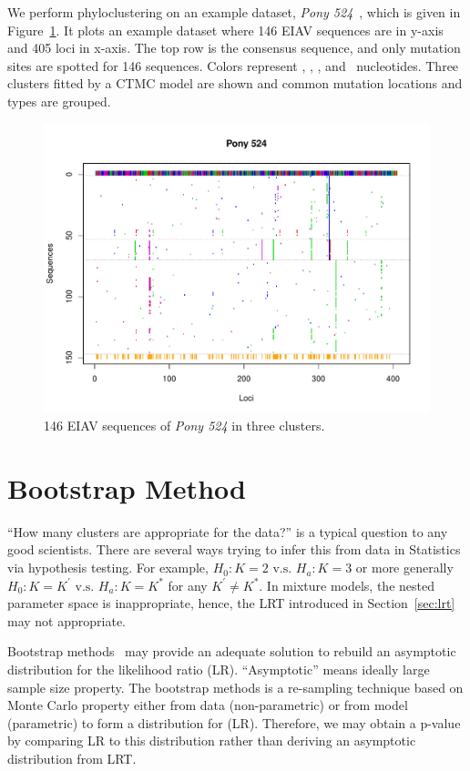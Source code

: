 We perform phyloclustering on an example dataset,
{\it Pony 524}~\citep{Carpenter2011},
which is given in Figure~\ref{fig:eiav}.
It plots an example dataset where 146 EIAV sequences
are in y-axis and 405 loci in x-axis.
The top row is the consensus sequence, and only mutation sites are spotted
for 146 sequences. Colors represent , , , and
 \ nucleotides. Three clusters fitted by a CTMC model are shown and
common mutation locations and types are grouped.
\begin{figure}[h!tb]
\centering
 \includegraphics[width=6in]{pbdDEMO-include/pics/pony524}
\caption{146 EIAV sequences of {\it Pony 524}
in three clusters.}
\label{fig:eiav}
\end{figure}




\section{Bootstrap Method}
\label{sec:bootstrap}

``How many clusters are appropriate for the data?'' is a typical question
to any good scientists. There are several ways trying to infer this from
data in Statistics via hypothesis testing. For example,
$H_0: K = 2 \mbox{ v.s. } H_a: K = 3$ or more generally
$H_0: K = K^\prime \mbox{ v.s. } H_a: K = K^*$ for any $K^\prime \neq K^*$.
In mixture models, the nested parameter space is inappropriate, hence,
the LRT introduced in Section~\ref{sec:lrt} may not appropriate.

Bootstrap methods~\citep{Efron1979}
may provide an adequate solution to
rebuild an asymptotic distribution for the likelihood ratio (LR).
``Asymptotic'' means ideally large sample size property.
The bootstrap methods is a re-sampling technique
based on Monte Carlo property
either from data (non-parametric)
or from model (parametric) to form a distribution for (LR).
Therefore, we may obtain a p-value by comparing LR to this distribution
rather than deriving an asymptotic distribution from LRT.


